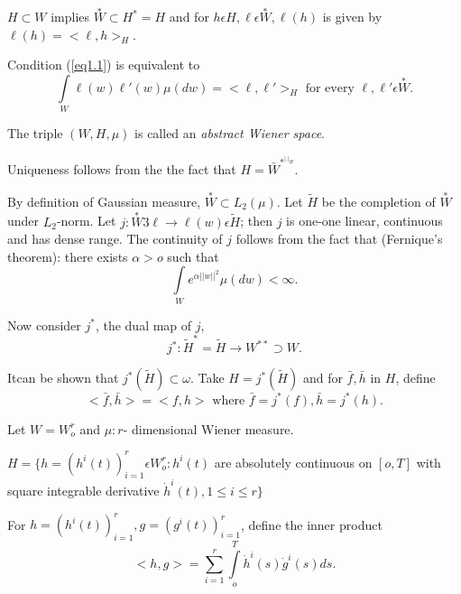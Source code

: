 \begin{remark}%
  $H \subset W$ implies  $\overset{\ast}{W} \subset H^*=H$ and for $h
  \epsilon  H, 
  \ell  \epsilon  \overset{\ast}{W}, \ell(h)$ is given by $\ell(h) = <
  \ell, h   >_H$. 
\end{remark}  

\begin{remark}%
  Condition (\ref{eq1.1}) is equivalent to 
  \begin{equation*}
    \int\limits_{W} \ell(w) \ell' (w) \mu (dw)= < \ell, \ell' >_H
    \text{ for every } \ell, \ell' \epsilon  \overset{\ast}{W}. \tag*{$(1.1)'$} 
  \end{equation*}
\end{remark}

\begin{remark}%
  The triple $(W,H, \mu)$ is called an {\em abstract Wiener space}.
\end{remark}  

\medskip
{} 
  Uniqueness follows from the the fact that $H= \bar{W}^{*^{|.|_H}}$.

\medskip
{}
 By definition of Gaussian measure, $\overset{\ast}{W}
\subset L_2 (\mu)$. Let $\tilde{H}$ be the completion of
$\overset{\ast}{W}$ under 
$L_2$-norm. Let $j: \overset{\ast}{W} 3 \ell \to \ell (w) \epsilon  \tilde{H}$;
then $j$ is one-one linear, continuous and has dense range. The
continuity of $j$ follows from the fact that (Fernique's theorem):
there exists $\alpha > o$ such that  
$$
\int\limits_{W} e^{\alpha || w ||^2} \mu (dw) < \infty.
$$ 

Now consider $j^*$, the dual map of $j$,
$$
j^*: \tilde{H}^* = \tilde{H} \to W^{**} \supset W.
$$

It\pageoriginale can be shown that $j^*(\tilde{H}) \subset
\omega$. Take $H=j^{*} 
(\tilde{H})$ and for $\bar{f}, \bar{h}$ in $H$, define 
$$
< \bar{f}, \bar{h}> = < f,h> \text{ where } \bar{f}= j^{*}(f),
\bar{h}= j^*(h). 
$$ 

\begin{example}\label{chap1:exam1.1}%
   Let $W=W^r_o$ and $\mu: r$- dimensional Wiener measure.

$H=\{h = (h^i(t))^r_{i=1} \epsilon  W^r_o: h^i(t)$ are absolutely
continuous on $[o, T]$ with square integrable derivative $\dot{h}^i(t),
1 \le i \le r \}$ 

For $h=(h^i(t))^r_{i=1}, g = (g^i (t))^r_{i=1}$, define the inner product
$$
<h, g> = \sum_{i=1}^{r} \int\limits_{o}^{T} \dot{h}^i (s) \dot{g}^i (s) ds.
$$
\end{example}

